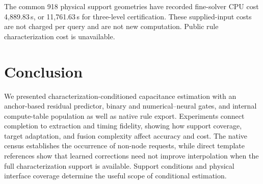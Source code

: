 \documentclass[conference,9pt,letterpaper]{IEEEtran}
\begin{document}
\begin{table}[t]\centering\caption{Supplied model cost: sum of three members' recorded final-stage training wall seconds, not parallel elapsed. Hardware and source-training opportunity differ; these are provenance costs, not matched speed rankings. Missing receipts are shown as --. Initialization, source-label generation and model selection are not fully aggregated, so complete training cost is unavailable.}\label{tab:sourcecost}\small\end{table}
The common 918 physical support geometries have recorded fine-solver CPU cost 4,889.83\,s, or 11,761.63\,s for three-level certification. These supplied-input costs are not charged per query and are not new computation. Public rule characterization cost is unavailable.
\begin{table}[t]\centering\caption{Complete new compute-table pipeline: three runs per layout/mode. PEX, its sample SD, SPEF output, STA read/analysis and external cold preparation are wall seconds. Net-C error and slack difference use the original full-rule reference. Preparation is reusable within a process library; native table construction/injection remains inside PEX.}\label{tab:allstages}\small\end{table}

\clearpage
\raggedbottom
\section{Conclusion}
We presented characterization-conditioned capacitance estimation with an anchor-based residual predictor, binary and numerical--neural gates, and internal compute-table population as well as native rule export. Experiments connect completion to extraction and timing fidelity, showing how support coverage, target adaptation, and fusion complexity affect accuracy and cost. The native census establishes the occurrence of non-node requests, while direct template references show that learned corrections need not improve interpolation when the full characterization support is available. Support conditions and physical interface coverage determine the useful scope of conditional estimation.




\end{document}
